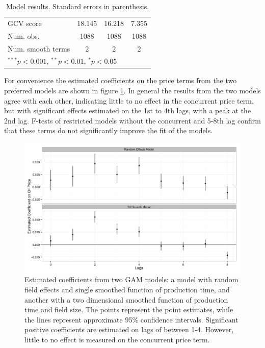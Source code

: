\documentclass[11pt]{article}
\begin{document}
\begin{table}
\begin{center}
\begin{tabular}{l c c c }
GCV score                                    & 18.145         & 16.218         & 7.355            \\
Num. obs.                                    & 1088           & 1088           & 1088             \\
Num. smooth terms                            & 2              & 2              & 2                \\
\hline
\multicolumn{4}{l}{\scriptsize{$^{***}p<0.001$, $^{**}p<0.01$, $^*p<0.05$}}
\end{tabular}
\caption{Model results. Standard errors in parenthesis.}
\label{GAM_model_table}
\end{center}
\end{table}
 
For convenience the estimated coefficients on the price terms from the two preferred models are shown in figure \ref{price_coefficients}. In general the results from the two models agree with each other, indicating little to no effect in the concurrent price term, but with significant effects estimated on the 1st to 4th lags, with a peak at the 2nd lag.  F-tests of restricted models without the concurrent and 5-8th lag confirm that these terms do not significantly improve the fit of the models.

\begin{figure}
	\includegraphics[width=1\textwidth]{figures/price_coefficents.png}
	\caption{Estimated coefficients from two GAM models: a model with random field effects and single smoothed function of production time, and another with a two dimensional smoothed function of production time and field size.  The points represent the point estimates, while the lines represent approximate 95\% confidence intervals. Significant positive coefficients are estimated on lags of between 1-4.  However, little to no effect is measured on the concurrent price term.}
	\label{price_coefficients}
\end{figure}
\end{document}
